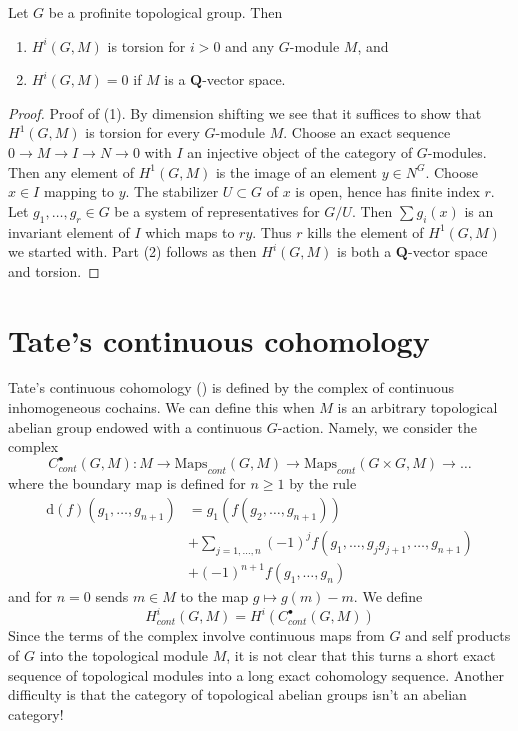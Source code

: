 \begin{lemma}
\label{lemma-profinite-group-cohomology-torsion}
Let $G$ be a profinite topological group.
Then
\begin{enumerate}
\item $H^i(G, M)$ is torsion for $i > 0$ and any $G$-module $M$, and
\item $H^i(G, M) = 0$ if $M$ is a $\mathbf{Q}$-vector space.
\end{enumerate}
\end{lemma}

\begin{proof}
Proof of (1). By dimension shifting we see that it suffices
to show that $H^1(G, M)$ is torsion for every $G$-module $M$.
Choose an exact sequence $0 \to M \to I \to N \to 0$ with $I$
an injective object of the category of $G$-modules.
Then any element of $H^1(G, M)$ is the image of an element
$y \in N^G$. Choose $x \in I$ mapping to $y$.
The stabilizer $U \subset G$ of $x$ is open, hence
has finite index $r$. Let $g_1, \ldots, g_r \in G$ be a system
of representatives for $G/U$. Then $\sum g_i(x)$ is an invariant
element of $I$ which maps to $ry$. Thus $r$ kills the element
of $H^1(G, M)$ we started with. Part (2) follows as then
$H^i(G, M)$ is both a $\mathbf{Q}$-vector space and torsion.
\end{proof}





\section{Tate's continuous cohomology}
\label{section-continuous-group-cohomology}

\noindent
Tate's continuous cohomology (\cite{Tate}) is defined by the complex of
continuous inhomogeneous cochains. We can define this when $M$ is an
arbitrary topological abelian group endowed with a continuous $G$-action.
Namely, we consider the complex
$$
C^\bullet_{cont}(G, M) :
M \to \text{Maps}_{cont}(G, M) \to
\text{Maps}_{cont}(G \times G, M) \to \ldots
$$
where the boundary map is defined for $n \geq 1$ by the rule
\begin{align*}
\text{d}(f)(g_1, \ldots, g_{n + 1})
& = g_1(f(g_2, \ldots, g_{n + 1})) \\
&
+ \sum\nolimits_{j = 1, \ldots, n}
(-1)^jf(g_1, \ldots, g_jg_{j + 1}, \ldots, g_{n + 1}) \\
&
+ (-1)^{n + 1}f(g_1, \ldots, g_n)
\end{align*}
and for $n = 0$ sends $m \in M$ to the map $g \mapsto g(m) - m$. We define
$$
H^i_{cont}(G, M) = H^i(C^\bullet_{cont}(G, M))
$$
Since the terms of the complex involve continuous maps from $G$ and
self products of $G$ into the topological module $M$, it is not clear
that this turns a short exact sequence of topological modules into
a long exact cohomology sequence. Another difficulty is that the category
of topological abelian groups isn't an abelian category!

